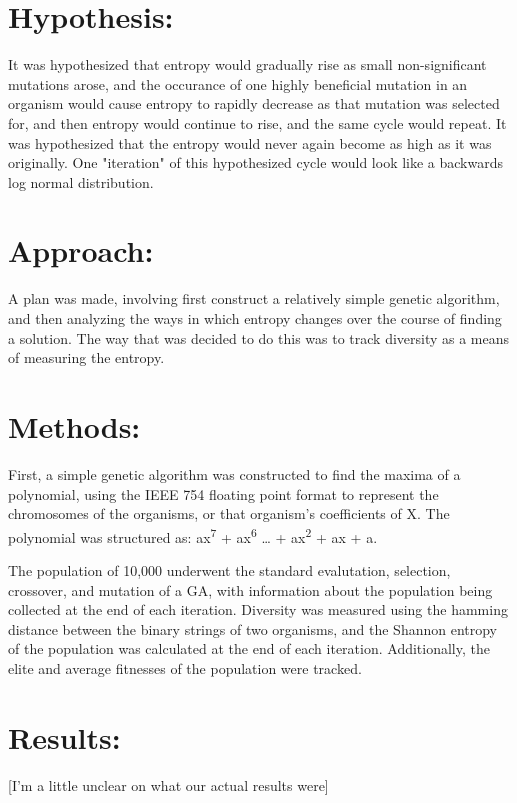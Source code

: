 \documentclass[11pt]{article}
\begin{document}
\section{Hypothesis:}
\label{sec:org26a3be1}
It was hypothesized that entropy would gradually rise as small non-significant mutations arose, and the occurance of one highly beneficial mutation in an organism would cause entropy to rapidly decrease as that mutation was selected for, and then entropy would continue to rise, and the same cycle would repeat. It was hypothesized that the entropy would never again become as high as it was originally. One "iteration" of this hypothesized cycle would look like a backwards log normal distribution.

\section{Approach:}
\label{sec:org8c588e5}
A plan was made, involving first construct a relatively simple genetic algorithm, and then analyzing the ways in which entropy changes over the course of finding a solution. The way that was decided to do this was to track diversity as a means of measuring the entropy.

\section{Methods:}
\label{sec:org2c55902}
First, a simple genetic algorithm was constructed to find the maxima of a polynomial, using the IEEE 754 floating point format to represent the chromosomes of the organisms, or that organism's coefficients of X. The polynomial was structured as: ax\textsuperscript{7} + ax\textsuperscript{6}  \ldots{} + ax\textsuperscript{2} + ax + a.

The population of 10,000 underwent the standard evalutation, selection, crossover, and mutation of a  GA, with information about the population being collected at the end of each iteration. Diversity was measured using the hamming distance between the binary strings of two organisms, and the Shannon entropy of the population was calculated at the end of each iteration. Additionally, the elite and average fitnesses of the population were tracked.

\section{Results:}
\label{sec:orged0917a}
[I'm a little unclear on what our actual results were]
\end{document}
